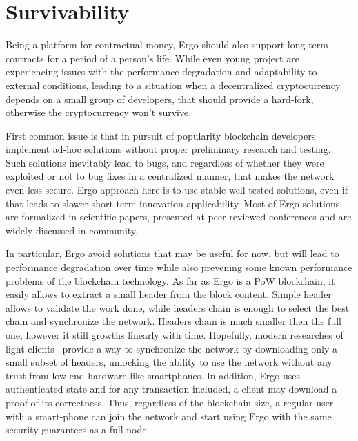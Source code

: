 \section{Survivability}
\label{sec:survivability}


Being a platform for contractual money, Ergo should also support long-term contracts for a
period of a person's life.
While even young project are experiencing issues with the performance degradation and
adaptability to external conditions, leading to a situation when a decentralized cryptocurrency
depends on a small group of developers, that should provide a hard-fork, otherwise the cryptocurrency
won't survive.

First common issue is that in pursuit of popularity blockchain developers implement ad-hoc
solutions without proper preliminary research and testing.
Such solutions inevitably lead to bugs, and regardless of whether they were exploited or not
to bug fixes in a centralized manner, that makes the network even less secure.
Ergo approach here is to use stable well-tested solutions, even if that leads to slower
short-term innovation applicability.
Most of Ergo solutions are formalized in scientific papers, presented at peer-reviewed conferences
and are widely discussed in community.

In particular, Ergo avoid solutions that may be useful for now, but will lead to performance degradation
over time while also prevening some known performance problems of the blockchain technology.
As far as Ergo is a PoW blockchain, it easily allows to extract a small header from the block content.
Simple header allows to validate the work done, while headers chain is enough to select the best chain
and synchronize the network.
Headers chain is much smaller then the full one, however it still growths linearly with time.
Hopefully, modern researches of light clients~\cite{nipopows, flight clients} provide a way to
synchronize the network by downloading only a small subset of headers, unlocking the ability to
use the network without any trust from low-end hardware like smartphones.
In addition, Ergo uses authenticated state\cite{???} and for any transaction included,
a client may download a proof of its correctness.
Thus, regardless of the blockchain size, a regular user with a
smart-phone can join the network and start using Ergo with the same security
guarantees as a full node.

